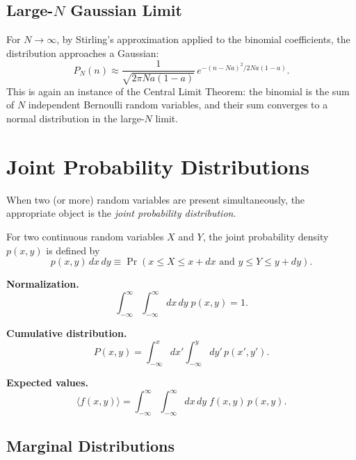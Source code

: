 \subsection{Large-$N$ Gaussian Limit}

For $N\to\infty$, by Stirling's approximation applied to the binomial coefficients, the distribution approaches a Gaussian:
\begin{equation}
    P_N(n) \approx \frac{1}{\sqrt{2\pi Na(1-a)}}\,e^{-(n-Na)^2/2Na(1-a)}.
\end{equation}
This is again an instance of the Central Limit Theorem: the binomial is the sum of $N$ independent Bernoulli random variables, and their sum converges to a normal distribution in the large-$N$ limit.

\section{Joint Probability Distributions}

When two (or more) random variables are present simultaneously, the appropriate object is the \emph{joint probability distribution}.

\begin{definition}
For two continuous random variables $X$ and $Y$, the joint probability density $p(x,y)$ is defined by
\begin{equation}
    p(x,y)\,dx\,dy \equiv \Pr(x \le X \le x+dx \text{ and } y \le Y \le y+dy).
\end{equation}
\end{definition}

\textbf{Normalization.}
\begin{equation}
    \int_{-\infty}^{\infty}\!\int_{-\infty}^{\infty} dx\,dy\; p(x,y) = 1.
\end{equation}

\textbf{Cumulative distribution.}
\begin{equation}
    P(x,y) = \int_{-\infty}^{x} dx'\!\int_{-\infty}^{y} dy'\, p(x',y').
\end{equation}

\textbf{Expected values.}
\begin{equation}
    \langle f(x,y)\rangle = \int_{-\infty}^{\infty}\!\int_{-\infty}^{\infty} dx\,dy\; f(x,y)\,p(x,y).
\end{equation}

\subsection{Marginal Distributions}

